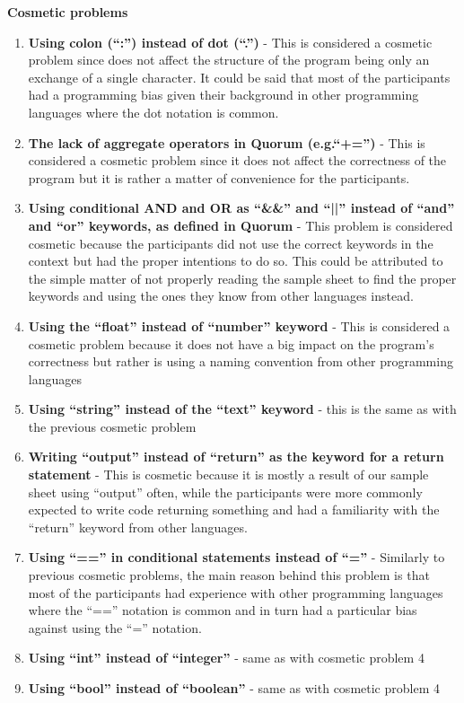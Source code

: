 \textbf{Cosmetic problems}
\begin{enumerate}
\item \textbf{Using colon (“:”) instead of dot (“.”)} - This is considered a cosmetic problem since does not affect the structure of the program being only an exchange of a single character. It could be said that most of the participants had a programming bias given their background in other programming languages where the dot notation is common.
\item \textbf{The lack of aggregate operators in Quorum (e.g.“+=”)} - This is considered a cosmetic problem since it does not affect the correctness of the program but it is rather a matter of convenience for the participants.
\item \textbf{Using conditional AND and OR as “\&\&” and “||” instead of “and” and “or” keywords, as defined in Quorum}  - This problem is considered cosmetic because the participants did not use the correct keywords in the context but had the proper intentions to do so. This could be attributed to the simple matter of not properly reading the sample sheet to find the proper keywords and using the ones they know from other languages instead.
\item \textbf{Using the “float” instead of “number” keyword} - This is considered a cosmetic problem because it does not have a big impact on the program’s correctness but rather is using a naming convention from other programming languages
\item \textbf{Using “string” instead of the “text” keyword} - this is the same as with the previous cosmetic problem
\item \textbf{Writing “output” instead of “return” as the keyword for a return statement} - This is cosmetic because it is mostly a result of our sample sheet using “output” often, while the participants were more commonly expected to write code returning something and had a familiarity with the “return” keyword from other languages.
\item \textbf{Using “==” in conditional statements instead of “=”} - Similarly to previous cosmetic problems, the main reason behind this problem is that most of the participants had experience with other programming languages where the “==” notation is common and in turn had a particular bias against using the “=” notation.
\item \textbf{Using “int” instead of “integer”}  - same as with cosmetic problem 4
\item \textbf{Using “bool” instead of “boolean”} - same as with cosmetic problem 4

\end{enumerate}
